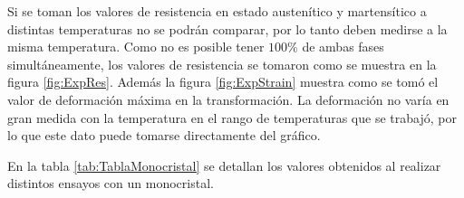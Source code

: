 \documentclass[a4paper,12pt,fleqn,twoside,openany]{book}
\begin{document}
Si se toman los valores de resistencia en estado austenítico y martensítico a distintas temperaturas no se podrán comparar, por lo tanto deben medirse a la misma temperatura. Como no es posible tener $100 \%$ de ambas fases simultáneamente, los valores de resistencia se tomaron como se muestra en la figura \ref{fig:ExpRes}. Además la figura \ref{fig:ExpStrain} muestra como se tomó el valor de deformación máxima en la transformación. La deformación no varía en gran medida con la temperatura en el rango de temperaturas que se trabajó, por lo que este dato puede tomarse directamente del gráfico.



 
    

    
    
En la tabla \ref{tab:TablaMonocristal} se detallan los valores obtenidos al realizar distintos ensayos con un monocristal.
\end{document}
